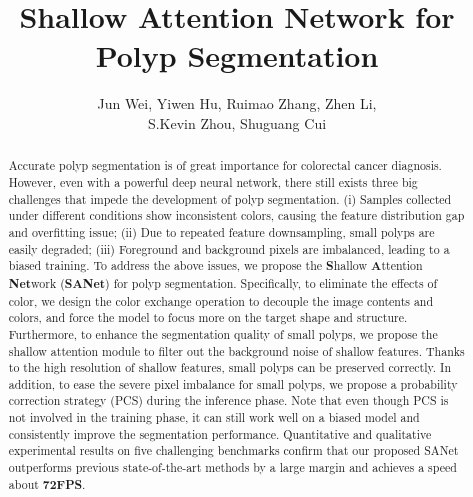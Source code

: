 \documentclass[runningheads]{llncs}
\makeatletter
\def\thanks{\protected@xdef\@thanks{\@thanks\protect\footnotetext{\dag\ Equal contributions}}}
\makeatother
\begin{document}
\title{Shallow Attention Network for Polyp Segmentation}




\author{
    Jun Wei,
    Yiwen Hu\inst{1,2,5,\thanks{\dag}},
    Ruimao Zhang,
    Zhen Li,\\
    S.Kevin Zhou,
    Shuguang Cui
}


\maketitle

\begin{abstract}
Accurate polyp segmentation is of great importance for colorectal cancer diagnosis. However, even with a powerful deep neural network, there still exists three big challenges that impede the development of polyp segmentation. (i) Samples collected under different conditions show inconsistent colors, causing the feature distribution gap and overfitting issue; (ii) Due to repeated feature downsampling, small polyps are easily degraded; (iii) Foreground and background pixels are imbalanced, leading to a biased training. 
To address the above issues, we propose the {\textbf{S}}hallow {\textbf{A}}ttention {\textbf{Net}}work ({\textbf{SANet}}) for polyp segmentation. Specifically, to eliminate the effects of color, we design the color exchange operation to decouple the image contents and colors, and force the model to focus more on the target shape and structure. 
Furthermore, to enhance the segmentation quality of small polyps, we propose the shallow attention module to filter out the background noise of shallow features. Thanks to the high resolution of shallow features, small polyps can be preserved correctly.
In addition, to ease the severe pixel imbalance for small polyps, we propose a probability correction strategy (PCS) during the inference phase. Note that even though PCS is not involved in the training phase, it can still work well on a biased model and consistently improve the segmentation performance. 
Quantitative and qualitative experimental results on five challenging benchmarks confirm that our proposed SANet outperforms previous state-of-the-art methods by a large margin and achieves a speed about \textbf{72FPS}.
\end{abstract}
\end{document}
